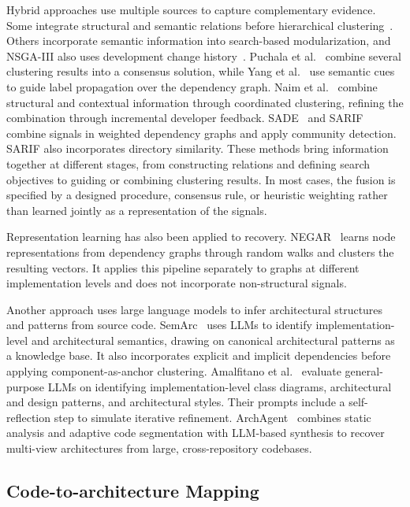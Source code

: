 Hybrid approaches use multiple sources to capture complementary evidence. Some integrate structural and semantic relations before hierarchical clustering~\cite{sc_misra,escrc}. Others incorporate semantic information into search-based modularization, and NSGA-III also uses development change history~\cite{sadat2019multi,nsga3}. Puchala et al.~\cite{ensemble_recovery} combine several clustering results into a consensus solution, while Yang et al.~\cite{evol} use semantic cues to guide label propagation over the dependency graph. Naim et al.~\cite{naim2017cchd} combine structural and contextual information through coordinated clustering, refining the combination through incremental developer feedback. SADE~\cite{sade} and SARIF~\cite{sarif} combine signals in weighted dependency graphs and apply community detection. SARIF also incorporates directory similarity. These methods bring information together at different stages, from constructing relations and defining search objectives to guiding or combining clustering results. In most cases, the fusion is specified by a designed procedure, consensus rule, or heuristic weighting rather than learned jointly as a representation of the signals.

Representation learning has also been applied to recovery. NEGAR~\cite{negar} learns node representations from dependency graphs through random walks and clusters the resulting vectors. It applies this pipeline separately to graphs at different implementation levels and does not incorporate non-structural signals.

Another approach uses large language models to infer architectural structures and patterns from source code. SemArc~\cite{sar_sem} uses LLMs to identify implementation-level and architectural semantics, drawing on canonical architectural patterns as a knowledge base. It also incorporates explicit and implicit dependencies before applying component-as-anchor clustering. Amalfitano et al.~\cite{amalfitano2025automated} evaluate general-purpose LLMs on identifying implementation-level class diagrams, architectural and design patterns, and architectural styles. Their prompts include a self-reflection step to simulate iterative refinement. ArchAgent~\cite{archagent} combines static analysis and adaptive code segmentation with LLM-based synthesis to recover multi-view architectures from large, cross-repository codebases.

\subsection{Code-to-architecture Mapping}

